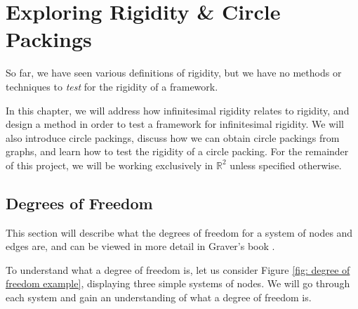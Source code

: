 \chapter{Exploring Rigidity \& Circle Packings}

\begin{flushleft}
So far, we have seen various definitions of rigidity, but we have no methods or techniques to \textit{test} for the rigidity of a framework. 
\end{flushleft}

\begin{flushleft}
In this chapter, we will address how infinitesimal rigidity relates to rigidity, and design a method in order to test a framework for infinitesimal rigidity. We will also introduce circle packings, discuss how we can obtain circle packings from graphs, and learn how to test the rigidity of a circle packing. For the remainder of this project, we will be working exclusively in $\mathbb{R}^2$ unless specified otherwise.
\end{flushleft}

\section{Degrees of Freedom}

\noindent
This section will describe what the degrees of freedom for a system of nodes and edges are, and can be viewed in more detail in Graver's book \cite{counting_frameworks}.

\begin{flushleft}
To understand what a degree of freedom is, let us consider Figure \ref{fig: degree of freedom example}, displaying three simple systems of nodes. We will go through each system and gain an understanding of what a degree of freedom is. 
\end{flushleft}

